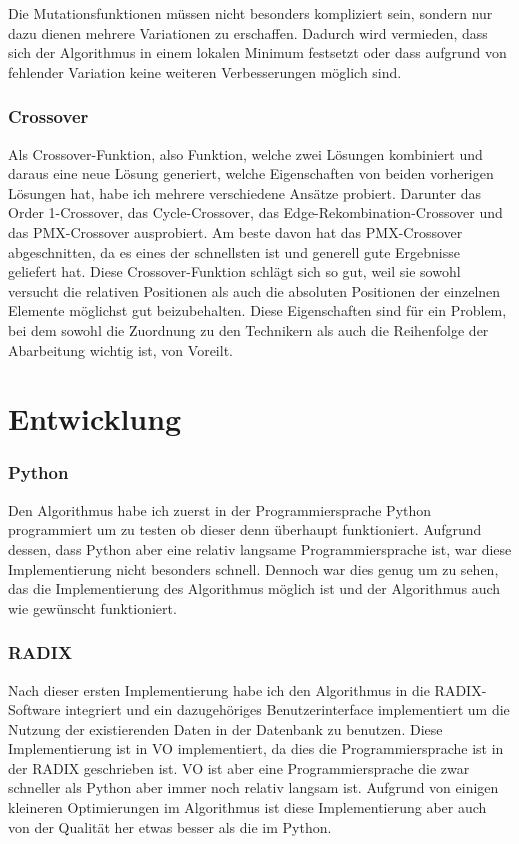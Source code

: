 \documentclass[a4paper,notitlepage,12pt]{report}
\begin{document}
Die Mutationsfunktionen müssen nicht besonders kompliziert sein, sondern nur dazu
dienen mehrere Variationen zu erschaffen. Dadurch wird vermieden, dass sich der
Algorithmus in einem lokalen Minimum festsetzt oder dass aufgrund von fehlender
Variation keine weiteren Verbesserungen möglich sind.

\subsubsection{Crossover}

Als Crossover-Funktion, also Funktion, welche zwei Lösungen kombiniert und daraus
eine neue Lösung generiert, welche Eigenschaften von beiden vorherigen Lösungen
hat, habe ich mehrere verschiedene Ansätze probiert. Darunter das Order 1-Crossover,
das Cycle-Crossover, das Edge-Rekombination-Crossover und das PMX-Crossover
ausprobiert. Am beste davon hat das PMX-Crossover abgeschnitten, da es eines der
schnellsten ist und generell gute Ergebnisse geliefert hat. Diese Crossover-Funktion
schlägt sich so gut, weil sie sowohl versucht die relativen Positionen als auch
die absoluten Positionen der einzelnen Elemente möglichst gut beizubehalten. Diese
Eigenschaften sind für ein Problem, bei dem sowohl die Zuordnung zu den Technikern
als auch die Reihenfolge der Abarbeitung wichtig ist, von Voreilt.

\section{Entwicklung}

\subsubsection{Python}

Den Algorithmus habe ich zuerst in der Programmiersprache Python programmiert um zu
testen ob dieser denn überhaupt funktioniert. Aufgrund dessen, dass Python aber
eine relativ langsame Programmiersprache ist, war diese Implementierung nicht
besonders schnell. Dennoch war dies genug um zu sehen, das die Implementierung
des Algorithmus möglich ist und der Algorithmus auch wie gewünscht funktioniert.

\subsubsection{RADIX}

Nach dieser ersten Implementierung habe ich den Algorithmus  in die RADIX-Software
integriert und ein dazugehöriges Benutzerinterface implementiert um die Nutzung
der existierenden Daten in der Datenbank zu benutzen. Diese Implementierung ist
in VO \cite{vo} implementiert, da dies die Programmiersprache ist in der RADIX geschrieben
ist. VO ist aber eine Programmiersprache die zwar schneller als Python aber immer
noch relativ langsam ist. Aufgrund von einigen kleineren Optimierungen im Algorithmus
ist diese Implementierung aber auch von der Qualität her etwas besser als die im
Python.
\end{document}
